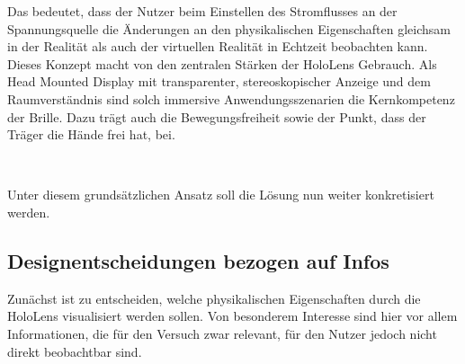Das bedeutet, dass der Nutzer beim Einstellen des Stromflusses an der Spannungsquelle die Änderungen an den physikalischen Eigenschaften gleichsam in der Realität als auch der virtuellen Realität in Echtzeit beobachten kann.\\

Dieses Konzept macht von den zentralen Stärken der HoloLens Gebrauch. Als Head Mounted Display mit transparenter, stereoskopischer Anzeige und dem Raumverständnis sind solch immersive Anwendungsszenarien die Kernkompetenz der Brille. Dazu trägt auch die Bewegungsfreiheit sowie der Punkt, dass der Träger die Hände frei hat, bei.

\vspace{8px}
\begin{center}
	\\
\end{center}
\vspace{6px}


Unter diesem grundsätzlichen Ansatz soll die Lösung nun weiter konkretisiert werden.


\subsection{Designentscheidungen bezogen auf Infos}
Zunächst ist zu entscheiden, welche physikalischen Eigenschaften durch die HoloLens visualisiert werden sollen. Von besonderem Interesse sind hier vor allem Informationen, die für den Versuch zwar relevant, für den Nutzer jedoch nicht direkt beobachtbar sind.\\

